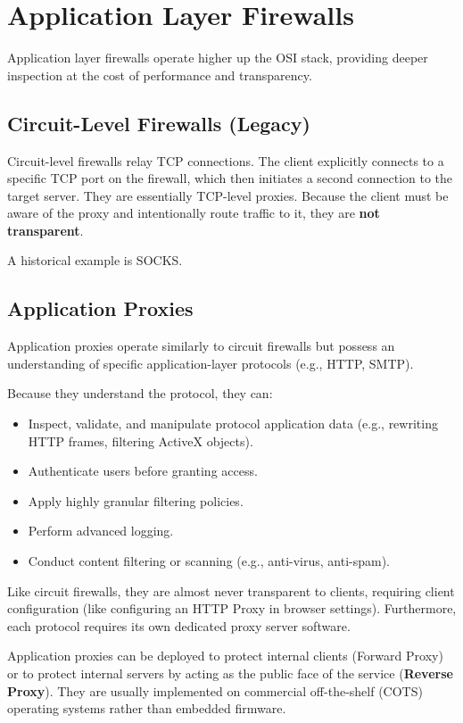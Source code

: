 \section{Application Layer Firewalls}

Application layer firewalls operate higher up the OSI stack, providing deeper inspection at the cost of performance and transparency.

\subsection{Circuit-Level Firewalls (Legacy)}

Circuit-level firewalls relay TCP connections. The client explicitly connects to a specific TCP port on the firewall, which then initiates a second connection to the target server. They are essentially TCP-level proxies. Because the client must be aware of the proxy and intentionally route traffic to it, they are \textbf{not transparent}. 

A historical example is SOCKS.

\subsection{Application Proxies}

Application proxies operate similarly to circuit firewalls but possess an understanding of specific application-layer protocols (e.g., HTTP, SMTP). 

Because they understand the protocol, they can:
\begin{itemize}
    \item Inspect, validate, and manipulate protocol application data (e.g., rewriting HTTP frames, filtering ActiveX objects).
    \item Authenticate users before granting access.
    \item Apply highly granular filtering policies.
    \item Perform advanced logging.
    \item Conduct content filtering or scanning (e.g., anti-virus, anti-spam).
\end{itemize}

Like circuit firewalls, they are almost never transparent to clients, requiring client configuration (like configuring an HTTP Proxy in browser settings). Furthermore, each protocol requires its own dedicated proxy server software.

Application proxies can be deployed to protect internal clients (Forward Proxy) or to protect internal servers by acting as the public face of the service (\textbf{Reverse Proxy}). They are usually implemented on commercial off-the-shelf (COTS) operating systems rather than embedded firmware.

